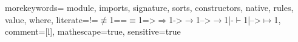  {
  morekeywords={
    module, imports,
    signature, sorts, constructors, native,
    rules, 
    value, 
    where},
  literate={!=}{$\not\equiv$}1{==}{$\equiv$}1{=>}{$\Rightarrow$}1{->}{$\rightarrow$}1{-->}{$\rightarrow$}1{|-}{$\vdash$}1{|-->}{$\mapsto$}1,
  comment=[l]{\/\/},
  mathescape=true,
  sensitive=true
}

\newcommand{\dynsemcode}[1]{\lstinline[language=DynSem,basicstyle=\lstinlinestyle]{#1}}
\newcommand{\DynSem}{\langname{DynSem}}

\newenvironment{dynsemfragment}{\begin{lstlisting}[language=DynSem]}{
\end{lstlisting}}